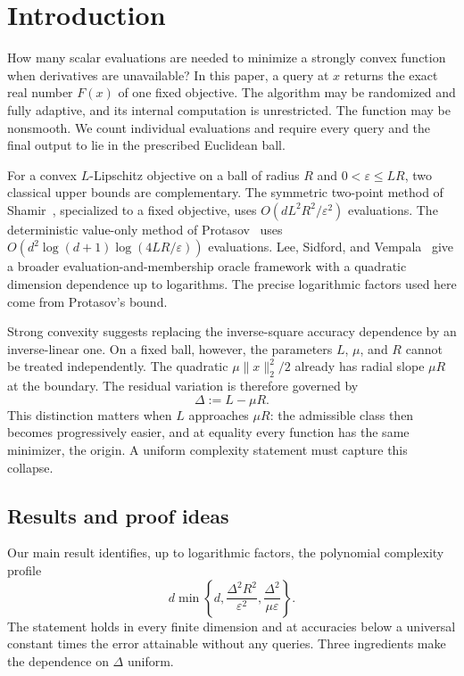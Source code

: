 \documentclass[11pt]{article}
\newcommand{\eps}{\varepsilon}
\theoremstyle{plain}
\theoremstyle{definition}
\begin{document}
\section{Introduction}\label{sec:intro}

How many scalar evaluations are needed to minimize a strongly convex
function when derivatives are unavailable? In this paper, a query at
$x$ returns the exact real number $F(x)$ of one fixed objective. The
algorithm may be randomized and fully adaptive, and its internal
computation is unrestricted. The function may be nonsmooth. We count
individual evaluations and require every query and the final output
to lie in the prescribed Euclidean ball.

For a convex $L$-Lipschitz objective on a ball of radius $R$ and
$0<\eps\le LR$, two classical upper bounds are complementary.
The symmetric two-point method of
Shamir~\cite[Corollary~2]{Shamir2017}, specialized to a fixed objective,
uses $O(dL^2R^2/\eps^2)$ evaluations. The deterministic value-only method
of Protasov~\cite{Protasov1996} uses
$O(d^2\log(d+1)\log(4LR/\eps))$ evaluations. Lee, Sidford, and
Vempala~\cite{LeeSidfordVempala2018} give a broader evaluation-and-membership
oracle framework with a quadratic dimension dependence up to logarithms.
The precise logarithmic factors used here come from Protasov's bound.

Strong convexity suggests replacing the inverse-square accuracy
dependence by an inverse-linear one. On a fixed ball, however, the
parameters $L$, $\mu$, and $R$ cannot be treated independently. The
quadratic $\mu\|x\|_2^2/2$ already has radial slope $\mu R$ at the
boundary. The residual variation is therefore governed by
\begin{equation}\label{eq:slack-intro}
 \Delta:=L-\mu R.
\end{equation}
This distinction matters when $L$ approaches $\mu R$: the admissible
class then becomes progressively easier, and at equality every function
has the same minimizer, the origin. A uniform complexity statement must
capture this collapse.

\subsection{Results and proof ideas}

Our main result identifies, up to logarithmic factors, the polynomial
complexity profile
\begin{equation}\label{eq:profile-intro}
 d\min\left\{d,\frac{\Delta^2R^2}{\eps^2},
                  \frac{\Delta^2}{\mu\eps}\right\}.
\end{equation}
The statement holds in every finite dimension and at accuracies below
a universal constant times the error attainable without any queries.
Three ingredients make the dependence on $\Delta$ uniform.
\end{document}
